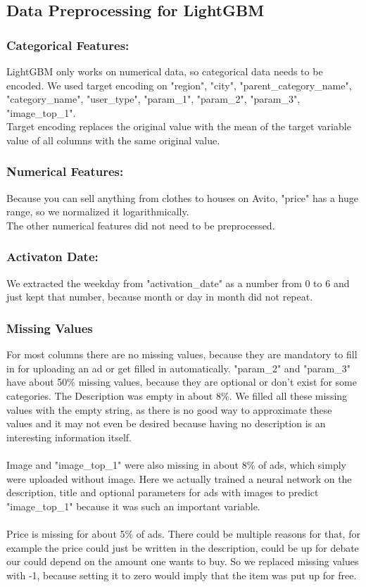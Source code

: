 \documentclass[runningheads]{llncs}
\begin{document}
\subsection{Data Preprocessing for LightGBM}
\subsubsection{Categorical Features:}
LightGBM only works on numerical data, so categorical data needs to be encoded. We used target encoding on "region", "city", "parent\_category\_name", "category\_name", "user\_type", "param\_1", "param\_2", "param\_3", "image\_top\_1".\\
Target encoding replaces the original value with the mean of the target variable value of all columns with the same original value.
\subsubsection{Numerical Features:}
Because you can sell anything from clothes to houses on Avito, "price" has a huge range, so we normalized it logarithmically.\\
The other numerical features did not need to be preprocessed.
\subsubsection{Activaton Date:} 
We extracted the weekday from "activation\_date" as a number from 0 to 6 and just kept that number, because month or day in month did not repeat.

\subsubsection{Missing Values}
 For most columns there are no missing values, because they are mandatory to fill in for uploading an ad or get filled in automatically. "param\_2" and "param\_3" have about 50\% missing values, because they are optional or don't exist for some categories. The Description was empty in about 8\%. We filled all these missing values with the empty string, as there is no good way to approximate these values and it may not even be desired because having no description is an interesting information itself.\\ \\
 Image and "image\_top\_1" were also missing in about 8\% of ads, which simply were uploaded without image. Here we actually trained a neural network on the description, title and optional parameters for ads with images to predict "image\_top\_1" because it was such an important variable.\\ \\
 Price is missing for about 5\%  of ads. There could be multiple reasons for that, for example the price could just be written in the description, could be up for debate our could depend on the amount one wants to buy. So we replaced missing values with -1, because setting it to zero would imply that the item was put up for free.
 
\end{document}
